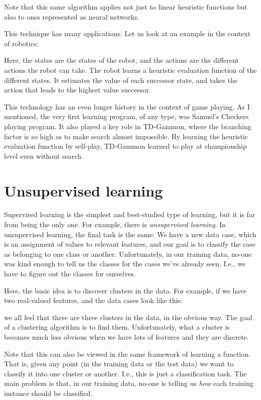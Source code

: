 Note that this same algorithm applies not just to linear heuristic functions
but also to ones represented as neural networks.

This technique has many applications.  Let us look at an example in the
context of robotics: 


Here, the states are the states of the robot, and the actions are the
different actions the robot can take.  The robot learns a heuristic
evaluation function of the different states.  It estimates the value of each 
successor state, and takes the action that leads to the highest value
successor. 

This technology has an even longer history in the context of game playing.
As I mentioned, the very first learning program, of any type, was Samuel's
Checkers playing program.  It also played a key role in TD-Gammon, where the
branching factor is so high as to make search almost impossible.  By
learning the heuristic evaluation function by self-play, TD-Gammon learned
to play at championship level even without search.


\section{Unsupervised learning}

Supervised learning is the simplest and best-studied type of learning, but
it is far from being the only one.  For example, there is {\em unsupervised
learning}.  In unsupervised learning, the final task is the same:  We
have a new data case, which is an assignment of values to relevant features,
and our goal is to classify the case as belonging to one class or another. 
Unfortunately, in our training data, no-one was kind enough to tell us the
classes for the cases we've already seen.  I.e., we have to figure out the
classes for ourselves.  

Here, the basic idea is to discover clusters in the data.  For example, if
we have two real-valued features, and the data cases look like this:


we all feel that there are three clusters in the data, in the obvious way.
The goal of a clustering algorithm is to find them.  Unfortunately, what a
cluster is becomes much less obvious when we have lots of features and they
are discrete.

Note that this can also be viewed in the same framework of learning a
function.  That is, given any point (in the training data or the test
data) we want to classify it into one cluster or another.  I.e., this
is just a classification task.  The main problem is that, in our
training data, no-one is telling us {\em how\/} each training instance
should be classified.

